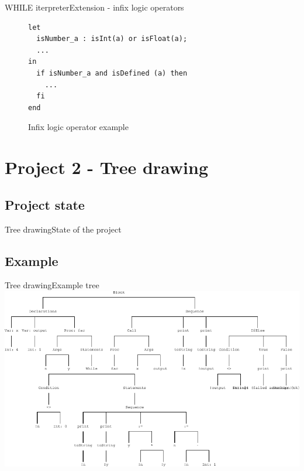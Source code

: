 \documentclass{beamer}
\begin{document}


\begin{frame}[fragile]{WHILE iterpreter}{Extension - infix logic operators}
\begin{figure}
\begin{lstlisting}
let
  isNumber_a : isInt(a) or isFloat(a);
  ...
in
  if isNumber_a and isDefined (a) then
    ...
  fi
end
\end{lstlisting}
\caption{Infix logic operator example}
\end{figure}
\end{frame}

\section{Project 2 - Tree drawing}
\subsection{Project state}
\begin{frame}{Tree drawing}{State of the project}
\end{frame}

\subsection{Example}
\begin{frame}{Tree drawing}{Example tree}
\includegraphics[width=1.00\textwidth]{treeprint_example}
\end{frame}
\end{document}
